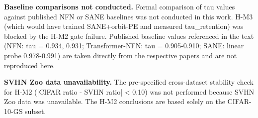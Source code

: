\textbf{Baseline comparisons not conducted.} Formal comparison of tau values against published NFN or SANE baselines was not conducted in this work. H-M3 (which would have trained SANE+orbit-PE and measured tau_retention) was blocked by the H-M2 gate failure. Published baseline values referenced in the text (NFN: tau = 0.934, 0.931; Transformer-NFN: tau = 0.905-0.910; SANE: linear probe 0.978-0.991) are taken directly from the respective papers and are not reproduced here.

\textbf{SVHN Zoo data unavailability.} The pre-specified cross-dataset stability check for H-M2 (|CIFAR ratio - SVHN ratio| < 0.10) was not performed because SVHN Zoo data was unavailable. The H-M2 conclusions are based solely on the CIFAR-10-GS subset.

